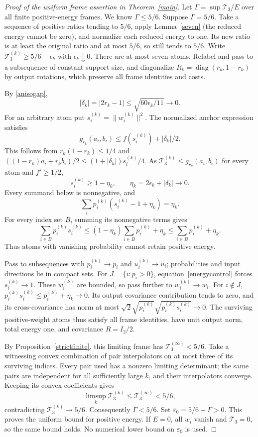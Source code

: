 \documentclass[10pt]{article}
\newcommand{\T}{\mathcal T_3}
\begin{document}
\begin{proof}[Proof of the uniform frame assertion in Theorem~\ref{main}]
Let $\Gamma=\sup\T/E$ over all finite positive-energy frames.
We know $\Gamma\le5/6$. Suppose $\Gamma=5/6$.
Take a sequence of positive ratios tending to $5/6$, apply
Lemma~\ref{seven} (the reduced energy cannot be zero), and
normalize each reduced energy to one. Its new ratio is at least the original
ratio and at most $5/6$, so still tends to $5/6$. Write
$\T^{(k)}\ge5/6-\epsilon_k$ with $\epsilon_k\downarrow0$.
There are at most seven atoms. Relabel and pass to a subsequence of constant
support size, and diagonalize $R_k=\operatorname{diag}(r_k,1-r_k)$ by
output rotations, which preserve all frame identities and costs.

By \eqref{anisogap},
\[
 |\delta_k|=|2r_k-1|\le\sqrt{60\epsilon_k/11}\longrightarrow0.
\]
For an arbitrary atom put $s_i^{(k)}=\|w_i^{(k)}\|^2$.
The normalized anchor expression satisfies
\[
 g_{r_k}(a_i,b_i)\le f(s_i^{(k)})+|\delta_k|/2.
\]
This follows from $r_k(1-r_k)\le1/4$ and
$((1-r_k)a_i+r_kb_i)/2\le(1+|\delta_k|)s_i^{(k)}/4$.
As $\T^{(k)}\le g_{r_k}(a_i,b_i)$ for every atom and $f'\ge1/2$,
\[
 s_i^{(k)}\ge1-\eta_k,\qquad
 \eta_k=2\epsilon_k+|\delta_k|\longrightarrow0.
\]
Every summand below is nonnegative, and
\begin{equation}\label{energycontrol}
 \sum_i p_i^{(k)}(s_i^{(k)}-1+\eta_k)=\eta_k.
\end{equation}
For every index set $B$, summing its nonnegative terms gives
\[
 \sum_{i\in B}p_i^{(k)}s_i^{(k)}
 \le(1-\eta_k)\sum_{i\in B}p_i^{(k)}+\eta_k
 \le\sum_{i\in B}p_i^{(k)}+\eta_k.
\]
Thus atoms with vanishing probability cannot retain positive energy.

Pass to subsequences with $p_i^{(k)}\to p_i$ and
$u_i^{(k)}\to u_i$; probabilities and input directions lie in compact sets.
For $J=\{i:p_i>0\}$, equation~\eqref{energycontrol} forces
$s_i^{(k)}\to1$. These $w_i^{(k)}$ are bounded, so pass further to
$w_i^{(k)}\to w_i$. For $i\notin J$,
$p_i^{(k)}s_i^{(k)}\le p_i^{(k)}+\eta_k\to0$.
Its output covariance contribution tends to zero, and its cross-covariance
has norm at most $\sqrt2\sqrt{p_i^{(k)}}\sqrt{p_i^{(k)}s_i^{(k)}}\to0$.
The surviving positive-weight atoms thus satisfy all frame identities,
have unit output norm, total energy one, and covariance $R=I_2/2$.

By Proposition~\ref{strictfinite}, this limiting frame has $\T^{(\infty)}<5/6$.
Take a witnessing convex combination of pair interpolators on at most three
of its surviving indices. Every pair used has a nonzero limiting determinant;
the same pairs are independent for all sufficiently large $k$, and their
interpolators converge. Keeping its convex coefficients gives
\[
 \limsup_k\T^{(k)}\le\T^{(\infty)}<5/6,
\]
contradicting $\T^{(k)}\to5/6$. Consequently $\Gamma<5/6$.
Set $\varepsilon_0=5/6-\Gamma>0$. This proves the uniform bound for
positive energy. If $E=0$, all $w_i$ vanish and $\T=0$, so the same
bound holds. No numerical lower bound on $\varepsilon_0$ is used.
\end{proof}
\end{document}
